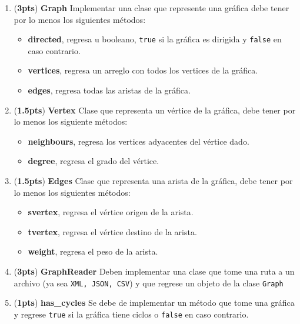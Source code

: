 \documentclass{article}
\newcommand{\grade}[1]{(\textbf{#1pts}) }
\begin{document}
\begin{enumerate}

\item \grade{3} \textbf{Graph} Implementar una clase que represente una gráfica debe tener por lo menos los siguientes métodos:

  \begin{itemize}
  \item \textbf{directed}, regresa u booleano, \texttt{true} si la gráfica es dirigida y \texttt{false} en caso contrario.
  \item \textbf{vertices}, regresa un arreglo con todos los vertices de la gráfica.
  \item \textbf{edges}, regresa todas las aristas de la gráfica.
  \end{itemize}

\item \grade{1.5} \textbf{Vertex} Clase que representa un vértice de la gráfica, debe tener por lo menos los siguiente métodos:

  \begin{itemize}
  \item \textbf{neighbours}, regresa los vertices adyacentes del vértice dado.
  \item \textbf{degree}, regresa el grado del vértice.
  \end{itemize}

\item \grade{1.5} \textbf{Edges} Clase que representa una arista de la gráfica, debe tener por lo menos los siguientes métodos:

  \begin{itemize}
  \item \textbf{svertex}, regresa el vértice origen de la arista.
  \item \textbf{tvertex}, regresa el vértice destino de la arista.
  \item \textbf{weight}, regresa el peso de la arista.
  \end{itemize}

 \item \grade{3} \textbf{GraphReader} Deben implementar una clase que tome una ruta a un archivo (ya sea \texttt{XML, JSON, CSV}) y que regrese un objeto de la clase \texttt{Graph}

 \item \grade{1} \textbf{has\_cycles} Se debe de implementar un método que tome una gráfica y regrese \texttt{true} si la gráfica tiene ciclos o \texttt{false} en caso contrario.


\end{enumerate}
\end{document}
